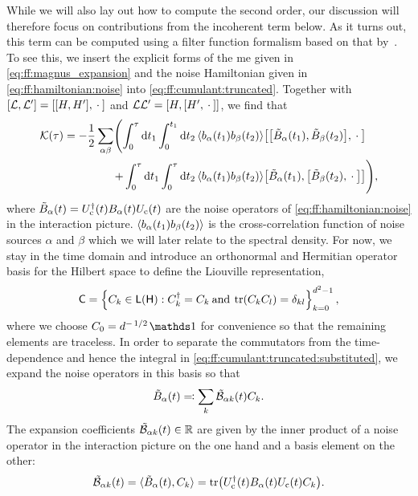 While we will also lay out how to compute the second order, our discussion will therefore focus on contributions from the incoherent term below.
As it turns out, this term can be computed using a filter function formalism based on that by~\citet{Green2013}.
To see this, we insert the explicit forms of the \gls{me} given in \cref{eq:ff:magnus_expansion} and the noise Hamiltonian given in \cref{eq:ff:hamiltonian:noise} into \cref{eq:ff:cumulant:truncated}.
Together with $\comm{\mc{L}}{\mc{L}'} = \comm{\comm{H}{H'}}{\placeholder}$ and $\mc{L}\mc{L}' = \comm{H}{\comm{H'}{\placeholder}}$, we find that
\begin{align}
    \cumulantfun(\tau) = -\frac{1}{2}\sum_{\alpha\beta}\Biggl(\int_0^\tau\dd{t_1}\int_0^{t_1}\dd{t_2}
    \expval{b_\alpha(t_1) b_\beta(t_2)} & \comm{\comm{\tilde{B}_\alpha(t_1)}{\tilde{B}_\beta(t_2)}}{\placeholder} \notag\\
    +\int_0^\tau\dd{t_1}\int_0^\tau\dd{t_2}
    \expval{b_\alpha(t_1) b_\beta(t_2)} & \comm{\tilde{B}_\alpha(t_1)}{\comm{\tilde{B}_\beta(t_2)}{\placeholder}}\Biggr), \label{eq:ff:cumulant:truncated:substituted}
\end{align}
where $\tilde{B}_\alpha(t) = U_{\mathrm{c}}^\dagger(t)B_\alpha(t)U_{\mathrm{c}}(t)$ are the noise operators of \cref{eq:ff:hamiltonian:noise} in the interaction picture.
$\ev{b_\alpha(t_1)b_\beta(t_2)}$ is the cross-correlation function of noise sources $\alpha$ and $\beta$ which we will later relate to the spectral density.
For now, we stay in the time domain and introduce an orthonormal and Hermitian operator basis for the Hilbert space \Hspace to define the Liouville representation,
\begin{equation}\label{eq:ff:basis}
\mathsf{C} = \left\lbrace C_k\in\mathsf{L}(\mathsf{H}): C_k^\dagger = C_k\:\text{and}\:\tr(C_k C_l) = \delta_{kl}\right\rbrace_{k=0}^{d^2-1},
\end{equation}
where we choose $C_0 = d^{-\flatfrac{1}{2}}\eye$ for convenience so that the remaining elements are traceless.
In order to separate the commutators from the time-dependence and hence the integral in \cref{eq:ff:cumulant:truncated:substituted}, we expand the noise operators in this basis so that
\begin{equation}\label{eq:ff:noise_operators:expanded}
\tilde{B}_\alpha(t) \eqqcolon \sum_k\tilde{\mathcal{B}}_{\alpha k}(t) C_k.
\end{equation}
The expansion coefficients $\tilde{\mathcal{B}}_{\alpha k}(t)\in\mathbb{R}$ are given by the inner product of a noise operator in the interaction picture on the one hand and a basis element on the other:
\begin{equation}\label{eq:ff:control_matrix}
\tilde{\mathcal{B}}_{\alpha k}(t) = \langle\tilde{B}_\alpha(t), C_k\rangle  = \tr(U_{\mathrm{c}}^\dagger(t)B_\alpha(t)U_{\mathrm{c}}(t)C_k).
\end{equation}
